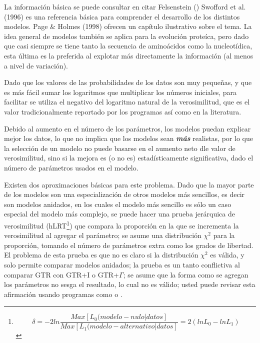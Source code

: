 La informaci\'on b\'asica se puede consultar en citar Felsenstein () %
Swofford et al. (1996) es una referencia b\'asica para comprender el desarrollo de los distintos modelos. Page \& Holmes (1998) ofrecen un cap\'itulo ilustrativo sobre el tema. La idea general de modelos tambi\'en se aplica para la evoluci\'on prote\'ica, pero dado que casi siempre se tiene tanto la secuencia de amino\'acidos como la nucleot\'idica, esta \'ultima es la preferida al explotar m\'as directamente la informaci\'on (al menos a nivel de variaci\'on).

Dado que los valores de las probabilidades de los datos son muy peque\~nas, y que es m\'as f\'acil sumar los logaritmos que multiplicar los n\'umeros iniciales, para facilitar se utiliza el negativo del logaritmo natural de la verosimilitud, que es el valor tradicionalmente reportado por los programas as\'i como en la literatura.

Debido al aumento en el n\'umero de los par\'ametros, los modelos puedan explicar mejor los datos, lo que no implica que los modelos sean \emph{\textbf{m\'as}} realistas, por lo que la selecci\'on de un modelo no puede basarse en el aumento neto dle valor de verosimilitud, sino si la mejora es (o no es) estad\'isticamente significativa, dado el n\'umero de par\'ametros usados en el modelo.

Existen dos aproximaciones b\'asicas para este problema. Dado que la mayor parte de los modelos son una especializaci\'on de otros modelos m\'as sencillos, es decir son modelos anidados, en los cuales el modelo m\'as sencillo es s\'olo un caso especial del modelo m\'as complejo, se puede hacer una prueba jer\'arquica de verosimilitud (hLRT\footnote
{\begin{equation}
\delta = -2 ln \frac{Max[L_{0}(modelo-nulo|datos]}{Max[L_{1}(modelo-alternativo|datos]} = 2 (ln L_{0} - ln L_{1}) 
\end{equation}
}) que compara la proporci\'on en la que se incrementa la verosimilitud al agregar el par\'ametro; se asume una distribuci\'on $\chi^2$  para la proporci\'on, tomando el n\'umero de par\'ametros extra como los grados de libertad. El problema de esta prueba es que no es claro si la distribuci\'on $\chi^2$ es v\'alida, y solo permite comparar modelos anidados; la prueba es un tanto conflictiva al comparar GTR con GTR+I o GTR+$\Gamma$; se asume que la forma como se agregan los par\'ametros no sesga el resultado, lo cual no es v\'alido; usted puede revisar esta afirmaci\'on usando programas como  o .

